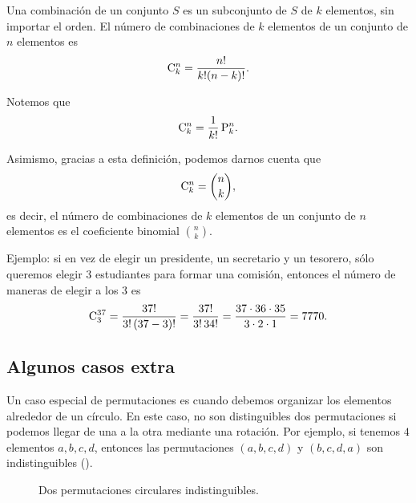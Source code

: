\formal
\begin{definition}[Combinación]
Una combinación de un conjunto \(S\) es un subconjunto de \(S\) de \(k\) elementos, sin importar el orden. El número de combinaciones de \(k\) elementos de un conjunto de \(n\) elementos es
\[\mathrm{C}^{n}_{k} = \frac{n!}{k!(n-k)!}.\]
\end{definition}

Notemos que \[\mathrm{C}^{n}_{k} = \frac{1}{k!} \,\mathrm{P}^{n}_{k}.\]

Asimismo, gracias a esta definición, podemos darnos cuenta que \[\mathrm{C}^{n}_{k} = \binom{n}{k},\] es decir, el número de combinaciones de \(k\) elementos de un conjunto de \(n\) elementos es el coeficiente binomial \(\binom{n}{k}\).

\informal

Ejemplo: si en vez de elegir un presidente, un secretario y un tesorero, sólo queremos elegir \(3\) estudiantes para formar una comisión, entonces el número de maneras de elegir a los \(3\) es \[\mathrm{C}^{37}_{3} = \frac{37!}{3!\,(37-3)!} = \frac{37!}{3!\,34!} = \frac{37 \cdot 36 \cdot 35}{3 \cdot 2 \cdot 1} = \num{7770}.\]

\subsection{Algunos casos extra}

Un caso especial de permutaciones es cuando debemos organizar los elementos alrededor de un círculo. En este caso, no son distinguibles dos permutaciones si podemos llegar de una a la otra mediante una rotación. Por ejemplo, si tenemos \(4\) elementos \(a, b, c, d\), entonces las permutaciones \((a, b, c, d)\) y \((b, c, d, a)\) son indistinguibles ().

\begin{figure}[H]
\caption{Dos permutaciones circulares indistinguibles.}
\end{figure}

